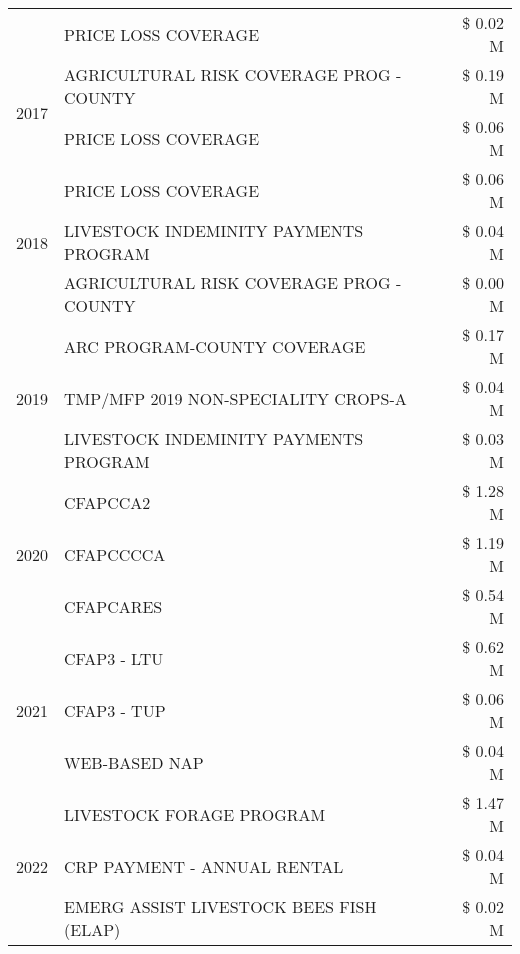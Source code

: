 \begin{tabular}{llr}
 & PRICE LOSS COVERAGE & \$ 0.02 M \\
\cline{1-3}
\multirow[t]{2}{*}{2017} & AGRICULTURAL RISK COVERAGE PROG - COUNTY & \$ 0.19 M \\
 & PRICE LOSS COVERAGE & \$ 0.06 M \\
\cline{1-3}
\multirow[t]{3}{*}{2018} & PRICE LOSS COVERAGE & \$ 0.06 M \\
 & LIVESTOCK INDEMINITY PAYMENTS PROGRAM & \$ 0.04 M \\
 & AGRICULTURAL RISK COVERAGE PROG - COUNTY & \$ 0.00 M \\
\cline{1-3}
\multirow[t]{3}{*}{2019} & ARC PROGRAM-COUNTY COVERAGE & \$ 0.17 M \\
 & TMP/MFP 2019 NON-SPECIALITY CROPS-A & \$ 0.04 M \\
 & LIVESTOCK INDEMINITY PAYMENTS PROGRAM & \$ 0.03 M \\
\cline{1-3}
\multirow[t]{3}{*}{2020} & CFAPCCA2 & \$ 1.28 M \\
 & CFAPCCCCA & \$ 1.19 M \\
 & CFAPCARES & \$ 0.54 M \\
\cline{1-3}
\multirow[t]{3}{*}{2021} & CFAP3 - LTU & \$ 0.62 M \\
 & CFAP3 - TUP & \$ 0.06 M \\
 & WEB-BASED NAP & \$ 0.04 M \\
\cline{1-3}
\multirow[t]{3}{*}{2022} & LIVESTOCK FORAGE PROGRAM & \$ 1.47 M \\
 & CRP PAYMENT - ANNUAL RENTAL & \$ 0.04 M \\
 & EMERG ASSIST LIVESTOCK BEES FISH (ELAP) & \$ 0.02 M \\
\cline{1-3}
\bottomrule
\end{tabular}

